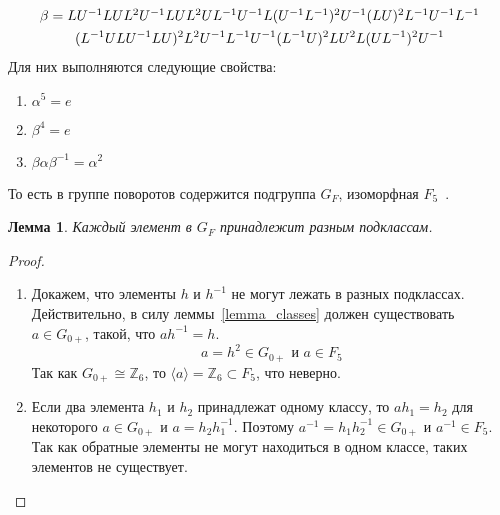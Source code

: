 \documentclass[utf8,a4paper,12pt]{article}
\newtheorem{lemma_cub}{Лемма}[section]
\begin{document}
\begin{multline*} %
$$
\beta=LU^{-1}LUL^2U^{-1}LUL^2UL^{-1}U^{-1}L(U^{-1}L^{-1})^2U^{-1}(LU)^2L^{-1}U^{-1}L^{-1}\\ 
		(L^{-1}ULU^{-1}LU)^2L^2U^{-1}L^{-1}U^{-1}(L^{-1}U)^2LU^2L(UL^{-1})^2U^{-1}
$$
\end{multline*}
Для них выполняются следующие свойства:
\begin{enumerate}
\item $\alpha^5=e$
\item $\beta^4=e$
\item $\beta\alpha\beta^{-1}=\alpha^2$
\end{enumerate}
То есть в группе поворотов содержится подгруппа $G_F$, изоморфная $F_5$~\cite{dummit}.%
\begin{lemma_cub}
	Каждый элемент в $G_F$ принадлежит разным подклассам.
	\label{lemma5}
\end{lemma_cub}
\begin{proof}
	\begin{enumerate}
		\item
		Докажем, что элементы $h$ и $h^{-1}$ не могут лежать в разных подклассах. Действительно, в силу леммы~\ref{lemma_classes} должен существовать $a\in G_{0+}$, такой, что $ah^{-1}=h$.
		$$a=h^2\in G_{0+}\text{ и }a\in F_5$$
		Так как $G_{0+}\cong \mathbb{Z}_6$, то $\langle a\rangle=\mathbb{Z}_6\subset F_5$, что неверно.
		\item
		Если два элемента $h_1$ и $h_2$ принадлежат одному классу, то $ah_1=h_2$ для некоторого $a\in G_{0+}$ и $a=h_2h_1^{-1}$. Поэтому $a^{-1}=h_1h_2^{-1}\in G_{0+}$ и $a^{-1}\in F_5$. Так как обратные элементы не могут находиться в одном классе, таких элементов не существует.
	\end{enumerate}
\end{proof}
\end{document}
